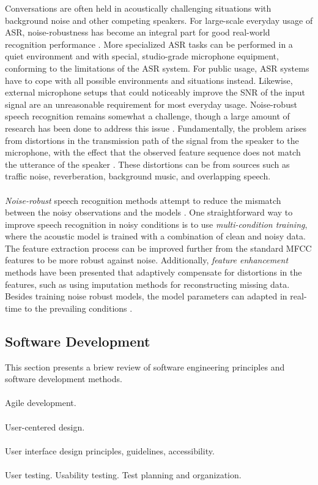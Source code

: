 \documentclass[english, 12pt, a4paper, pdftex, elec, utf8]{aaltothesis}
\begin{document}
Conversations are often held in acoustically challenging situations with background noise and other competing speakers. For large-scale everyday usage of ASR, noise-robustness has become an integral part for good real-world recognition performance \cite{li2014overview}. More specialized ASR tasks can be performed in a quiet environment and with special, studio-grade microphone equipment, conforming to the limitations of the ASR system. For public usage, ASR systems have to cope with all possible environments and situations instead. Likewise, external microphone setups that could noticeably improve the SNR of the input signal are an unreasonable requirement for most everyday usage. Noise-robust speech recognition remains somewhat a challenge, though a large amount of research has been done to address this issue \cite{kallasjoki2016, keronen2010comparison, keronen2014approaching, li2014overview, qian2016very}. Fundamentally, the problem arises from distortions in the transmission path of the signal from the speaker to the microphone, with the effect that the observed feature sequence does not match the utterance of the speaker \cite{kallasjoki2016, li2014overview}. These distortions can be from sources such as traffic noise, reverberation, background music, and overlapping speech. \\\\
\textit{Noise-robust} speech recognition methods attempt to reduce the mismatch between the noisy observations and the models \cite{li2014overview, kallasjoki2016, keronen2010comparison}. One straightforward way to improve speech recognition in noisy conditions is to use \textit{multi-condition training}, where the acoustic model is trained with a combination of clean and noisy data. The feature extraction process can be improved further from the standard MFCC features to be more robust against noise. Additionally, \textit{feature enhancement} methods have been presented that adaptively compensate for distortions in the features, such as using imputation methods for reconstructing missing data. Besides training noise robust models, the model parameters can adapted in real-time to the prevailing conditions \cite{kallasjoki2016}.

\subsection{Software Development} \label{subsec:soft}

This section presents a briew review of software engineering principles and software development methods. \\\\
Agile development. \\\\
User-centered design. \\\\
User interface design principles, guidelines, accessibility. \\\\
User testing. Usability testing. Test planning and organization.
\end{document}
